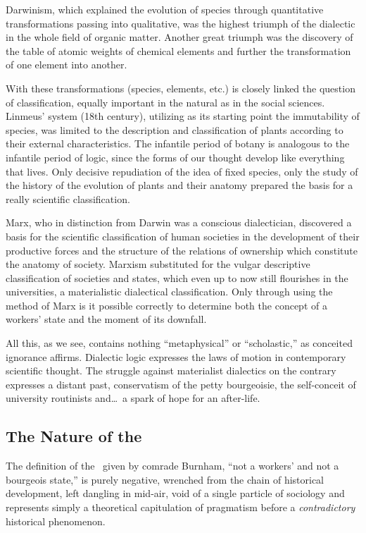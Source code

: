 Darwinism, which explained the evolution of species through quantitative transformations passing into qualitative, was the highest triumph of the dialectic in the whole field of organic matter. Another great triumph was the discovery of the table of atomic weights of chemical elements and further the transformation of one element into another.

With these transformations (species, elements, etc.) is closely linked the question of classification, equally important in the natural as in the social sciences. Linmeus’ system (18th century), utilizing as its starting point the immutability of species, was limited to the description and classification of plants according to their external characteristics. The infantile period of botany is analogous to the infantile period of logic, since the forms of our thought develop like everything that lives. Only decisive repudiation of the idea of fixed species, only the study of the history of the evolution of plants and their anatomy prepared the basis for a really scientific classification.

Marx, who in distinction from Darwin was a conscious dialectician, discovered a basis for the scientific classification of human societies in the development of their productive forces and the structure of the relations of ownership which constitute the anatomy of society. Marxism substituted for the vulgar descriptive classification of societies and states, which even up to now still flourishes in the universities, a materialistic dialectical classification. Only through using the method of Marx is it possible correctly to determine both the concept of a workers’ state and the moment of its downfall.

All this, as we see, contains nothing “metaphysical” or “scholastic,” as conceited ignorance affirms. Dialectic logic expresses the laws of motion in contemporary scientific thought. The struggle against materialist dialectics on the contrary expresses a distant past, conservatism of the petty bourgeoisie, the self-conceit of university routinists and\dots\ a spark of hope for an after-life.

\subsection*{The Nature of the \USSR}

The definition of the \USSR\ given by comrade Burnham, “not a workers’ and not a bourgeois state,” is purely negative, wrenched from the chain of historical development, left dangling in mid-air, void of a single particle of sociology and represents simply a theoretical capitulation of pragmatism before a \emph{contradictory} historical phenomenon.

